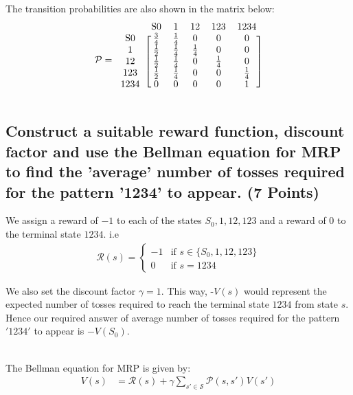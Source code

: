 \documentclass{article}
\renewcommand{\S}{\mathcal{S}}
\renewcommand{\P}{\mathcal{P}}
\newcommand{\R}{\mathcal{R}}
\begin{document}
\noindent
The transition probabilities are also shown in the matrix below: 
\vspace*{-1mm}
\begin{align}
	\P = \begin{blockarray}{cccccc}
	& \text{S0} & \text{1} & \text{12} & \text{123} & \text{1234} \\
	\begin{block}{c[ccccc]}
	\text{S0} & \frac{3}{4} & \frac{1}{4} & 0 & 0 & 0 \\
	\text{1} & \frac{1}{2} & \frac{1}{4} & \frac{1}{4} & 0 & 0 \\
	\text{12} & \frac{1}{2} & \frac{1}{4} & 0 & \frac{1}{4} & 0 \\
	\text{123} & \frac{1}{2} & \frac{1}{4} & 0 & 0 & \frac{1}{4} \\
	\text{1234} & 0 & 0 & 0 & 0 & 1 \\
	\end{block}
	\end{blockarray}
\end{align}
	
\subsection{Construct a suitable reward function, discount factor and use the Bellman equation for MRP to find the 'average' number of tosses required for the pattern '1234' to appear. (7 Points)}

We assign a reward of $-1$ to each of the states $S_0, 1, 12, 123$ and a reward of $0$ to the terminal state $1234$. i.e 
\begin{align}
	\R(s) = \begin{cases}
		-1 & \text{if } s \in \{S_0, 1, 12, 123\} \\
		0 & \text{if } s = 1234
	\end{cases}
\end{align}

We also set the discount factor $\gamma = 1$. This way, -$V(s)$ would represent the expected number of tosses required to reach the terminal state $1234$ from state $s$. Hence our required answer of average number of tosses required for the pattern $'1234'$ to appear is $-V(S_0)$.

\,\\
The Bellman equation for MRP is given by:
\begin{align}
	V(s) &= \R(s) + \gamma \sum_{s' \in \S} \P(s, s') V(s')
\end{align}
\end{document}
